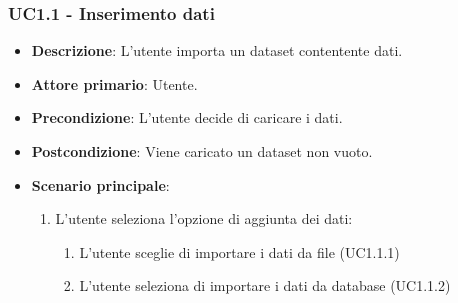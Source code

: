 \subsubsection{UC1.1 - Inserimento dati}
\label{ssub:UC1.1}
\begin{itemize}
    \item \textbf{Descrizione}: L'utente importa un dataset contentente dati.

    \item \textbf{Attore primario}: Utente.
    
    \item \textbf{Precondizione}:   L'utente decide di caricare i dati.

    \item \textbf{Postcondizione}:  Viene caricato un dataset non vuoto. 

	\item \textbf{Scenario principale}:
		\begin{enumerate}
			\item L'utente seleziona l'opzione di aggiunta dei dati:
            \begin{enumerate}
                \item L'utente sceglie di importare i dati da file (UC1.1.1)
                \item L'utente seleziona di importare i dati da database (UC1.1.2)
            \end{enumerate}
        \end{enumerate}
     
\end{itemize}


